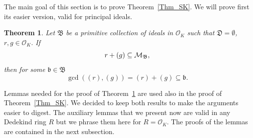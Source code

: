 \documentclass[leqno,a4paper,12pt]{article}
\newtheorem{Th}{Theorem}[section]
\newtheorem{Lemma}[Th]{Lemma}
\theoremstyle{definition}
\newcommand{\cm}{{\cal M}}
\newcommand{\OK}{\mathcal{O}_K}
\begin{document}
The main goal of this section is to prove Theorem~\ref{Thm_SK}. We will prove first its easier version, valid for principal ideals.
\begin{Th}\label{cor_toeplitz}
Let $\mathfrak{B}$ be a primitive collection of ideals in $\OK$ such that $\mathfrak{D}=\emptyset$, $r,g\in\OK$. If
\begin{equation}\label{principal}
r+(g)\subseteq\cm_\mathfrak{B},
\end{equation}
then for some $\mathfrak{b}\in\mathfrak{B}$
\[
\gcd((r),(g))=(r)+(g)\subseteq\mathfrak{b}.
\]
\end{Th}
Lemmas needed for the proof of Theorem~\ref{cor_toeplitz} are used also in the proof of Theorem~\ref{Thm_SK}. We decided to keep both results to make the arguments easier to digest. The auxiliary lemmas that we present now are valid in any Dedekind ring $R$ but we phrase them here for $R=\OK$. The proofs of the lemmas are contained in the next subsection.%
\end{document}
